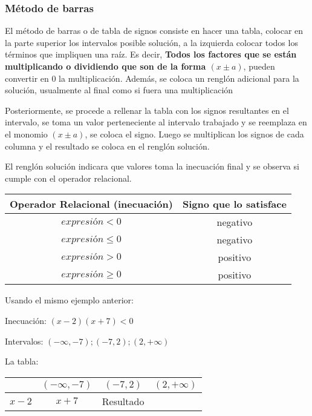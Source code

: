    \subsubsection{Método de barras} \label{Metodo-de-barras}

   El método de barras o de tabla de signos consiste en hacer una tabla, colocar
   en la parte superior los intervalos posible solución, a la izquierda colocar
   todos los términos que impliquen una raíz. Es decir, \textbf{Todos los factores
   que se están multiplicando o dividiendo que son de la forma $(x\pm a) $},
   pueden convertir en 0 la multiplicación. Además, se coloca  un renglón adicional
   para la solución, usualmente al final como si fuera una multiplicación

   Posteriormente, se procede a rellenar la tabla con los signos resultantes en
   el intervalo, se toma un valor perteneciente al intervalo trabajado
   y se reemplaza en el monomio $(x\pm a) $, se coloca el signo. Luego se
   multiplican los signos de cada columna y el resultado se coloca en el renglón
   solución.

    El renglón solución indicara que valores toma la inecuación final y se observa
    si cumple con el operador relacional.

    \vspace*{1cm}
    \begin{tabular}{|c|c|}
        \hline
        Operador Relacional (inecuación)    &  Signo que lo satisface\\\hline
        $expresión<0 $                      &  negativo \n \\\hline
        $ expresión\leq0 $                  &  negativo \n \\\hline
        $expresión>0$                       &  positivo \p \\\hline
        $ expresión\geq0 $                  &  positivo \p \\\hline
    \end{tabular}

    \vspace*{1cm}
    Usando el mismo ejemplo anterior:

    Inecuación: $ (x-2)(x+7) < 0 $

    Intervalos: $ \displaystyle (-\infty,-7);(-7,2);(2,+\infty)$

    La tabla:

    \vspace*{1cm}
    \begin{tabular}{|c|c|c|c|}
              & $(-\infty,-7)$ & $(-7,2)$ & $(2,+\infty)$\\\hline
        $x-2$ &
        $x+7$ &
    Resultado &
    \end{tabular}

